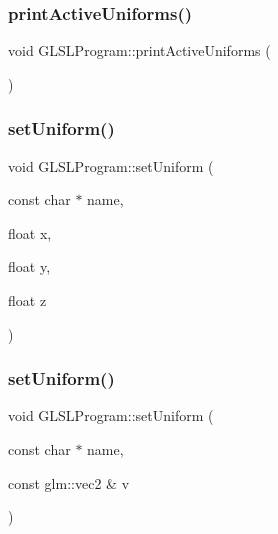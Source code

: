 \subsubsection{\texorpdfstring{printActiveUniforms()}{printActiveUniforms()}}
{\footnotesize\ttfamily void G\+L\+S\+L\+Program\+::print\+Active\+Uniforms (\begin{DoxyParamCaption}{ }\end{DoxyParamCaption})}

\mbox{\label{class_g_l_s_l_program_a85e4c896c2a8524cb4574a064a2dfb0c}} 
\subsubsection{\texorpdfstring{setUniform()}{setUniform()}\hspace{0.1cm}{\footnotesize\ttfamily [1/10]}}
{\footnotesize\ttfamily void G\+L\+S\+L\+Program\+::set\+Uniform (\begin{DoxyParamCaption}\item[{const char $\ast$}]{name,  }\item[{float}]{x,  }\item[{float}]{y,  }\item[{float}]{z }\end{DoxyParamCaption})}

\mbox{\label{class_g_l_s_l_program_af22f53e794e4ce01b8fb8a754ccc9594}} 
\subsubsection{\texorpdfstring{setUniform()}{setUniform()}\hspace{0.1cm}{\footnotesize\ttfamily [2/10]}}
{\footnotesize\ttfamily void G\+L\+S\+L\+Program\+::set\+Uniform (\begin{DoxyParamCaption}\item[{const char $\ast$}]{name,  }\item[{const glm\+::vec2 \&}]{v }\end{DoxyParamCaption})}

\mbox{\label{class_g_l_s_l_program_a194871e083c912c8606310829d29ca0b}} 

